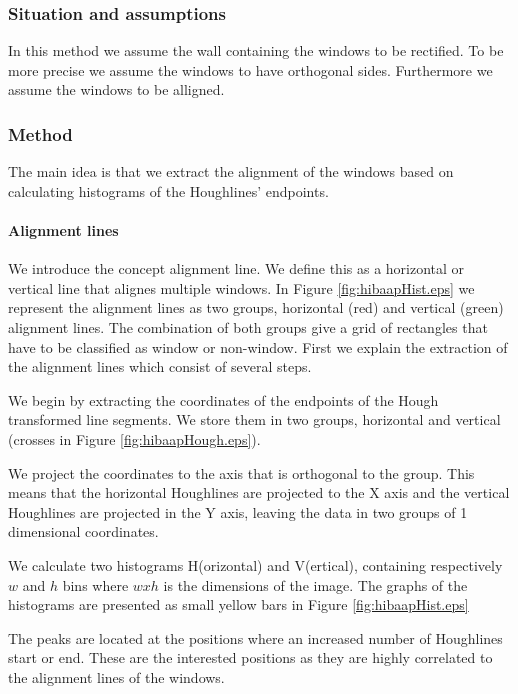 \subsubsection{Situation and assumptions}
In this method we assume the wall containing the windows to be rectified.
To be more precise we assume the windows to have orthogonal sides.
Furthermore we assume the windows to be alligned.

\subsubsection{Method}
The main idea is that we extract the alignment of the windows based on
calculating histograms of the Houghlines' endpoints.

\paragraph{Alignment lines}
We introduce the concept alignment line. We define this as a horizontal or
vertical line that alignes multiple windows. In Figure
\ref{fig:hibaapHist.eps}
we represent the alignment lines as two groups, horizontal (red) and
vertical (green) alignment lines.  The combination of both groups give a grid of
rectangles that have to be classified as window or non-window.
First we explain the extraction of the alignment lines which consist of several
steps.

We begin by extracting the coordinates of the endpoints of the Hough transformed line
segments. We store them in two groups, horizontal and vertical (crosses in Figure
\ref{fig:hibaapHough.eps}). 


We project the coordinates to the axis that is orthogonal to the group. This means
that the horizontal Houghlines are projected to the X axis and the vertical
Houghlines are projected in the Y axis, leaving the data in two groups of 1
dimensional coordinates.

We calculate two histograms H(orizontal) and V(ertical), containing respectively
$w$ and $h$ bins where $w x h$ is the dimensions of the image.  The graphs of
the histograms are presented as small yellow bars in Figure
\ref{fig:hibaapHist.eps}

The peaks are located at the positions where an increased number of Houghlines
start or end.  These are the interested positions as they are highly correlated
to the alignment lines of the windows. 

